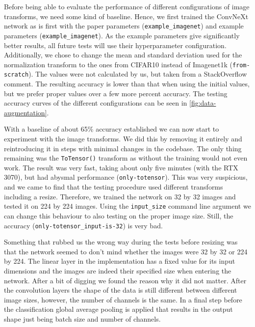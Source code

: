 \documentclass{article}
\begin{document}
Before being able to evaluate the performance of different configurations of image transforms, we need some kind of baseline.
Hence, we first trained the ConvNeXt network as is first with the paper parameters (\texttt{example\_imagenet}) and example parameters (\texttt{example\_imagenet}).
As the example parameters give significantly better results, all future tests will use their hyperparameter configuration.
Additionally, we chose to change the mean and standard deviation used for the normalization transform to the ones from CIFAR10 instead of Imagenet1k (\texttt{from-scratch}).
The values were not calculated by us, but taken from a StackOverflow\cite{stackoverflow} comment.
The resulting accuracy is lower than that when using the initial values, but we prefer proper values over a few more percent accuracy.
The testing accuracy curves of the different configurations can be seen in \autoref{fig:data-augmentation}.

With a baseline of about 65\% accuracy established we can now start to experiment with the image transforms.
We did this by removing it entirely and reintroducing it in steps with minimal changes in the codebase.
The only thing remaining was the \texttt{ToTensor()} transform as without the training would not even work.
The result was very fast, taking about only five minutes (with the RTX 3070), but had abysmal performance (\texttt{only-totensor}).
This was very suspicious, and we came to find that the testing procedure used different transforms including a resize.
Therefore, we trained the network on 32 by 32 images and tested it on 224 by 224 images.
Using the \texttt{input\_size} command line argument we can change this behaviour to also testing on the proper image size.
Still, the accuracy (\texttt{only-totensor\_input-is-32}) is very bad.

Something that rubbed us the wrong way during the tests before resizing was that the network seemed to don't mind whether the images were 32 by 32 or 224 by 224.
The linear layer in the implementation has a fixed value for its input dimensions and the images are indeed their specified size when entering the network.
After a bit of digging we found the reason why it did not matter.
After the convolution layers the shape of the data is still different between different image sizes, however, the number of channels is the same.
In a final step before the classification global average pooling is applied that results in the output shape just being batch size and number of channels.
\end{document}
